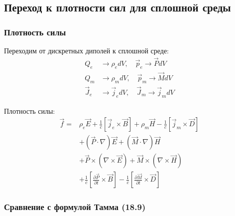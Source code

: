 \documentclass[a4paper,12pt]{article}
\begin{document}
\subsection{Переход к плотности сил для сплошной среды}

\subsubsection{Плотность силы}

Переходим от дискретных диполей к сплошной среде:
\begin{align}
Q_e &\to \rho_e dV, \quad \vec{p}_e \to \vec{P} dV \\
Q_m &\to \rho_m dV, \quad \vec{p}_m \to \vec{M} dV \\
\vec{J}_e &\to \vec{j}_e dV, \quad \vec{J}_m \to \vec{j}_m dV
\end{align}

Плотность силы:
\begin{equation}
\boxed{
\begin{aligned}
\vec{f} = & \rho_e\vec{E} + \frac{1}{c}[\vec{j}_e\times\vec{B}] + \rho_m\vec{H} - \frac{1}{c}[\vec{j}_m\times\vec{D}] \\
& + (\vec{P}\cdot\nabla)\vec{E} + (\vec{M}\cdot\nabla)\vec{H} \\
& + \vec{P}\times(\nabla\times\vec{E}) + \vec{M}\times(\nabla\times\vec{H}) \\
& + \frac{1}{c}\left[\frac{\partial\vec{P}}{\partial t}\times\vec{B}\right] - \frac{1}{c}\left[\frac{\partial\vec{M}}{\partial t}\times\vec{D}\right]
\end{aligned}
}
\label{eq:force_density_final}
\end{equation}

\subsubsection{Сравнение с формулой Тамма (18.9)}
\end{document}
